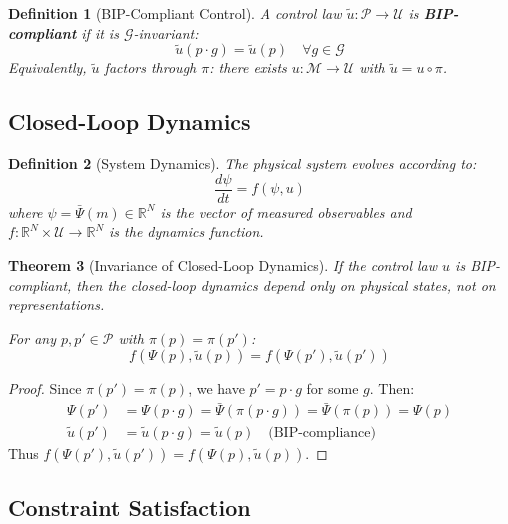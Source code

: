 \documentclass[11pt]{article}
\newtheorem{theorem}{Theorem}[section]
\newtheorem{definition}[theorem]{Definition}
\begin{document}
\begin{definition}[BIP-Compliant Control]
A control law $\tilde{u} : \mathcal{P} \to \mathcal{U}$ is \textbf{BIP-compliant} if it is
$\mathcal{G}$-invariant:
\[
\tilde{u}(p \cdot g) = \tilde{u}(p) \quad \forall g \in \mathcal{G}
\]
Equivalently, $\tilde{u}$ factors through $\pi$: there exists $u : \mathcal{M} \to \mathcal{U}$ with $\tilde{u} = u \circ \pi$.
\end{definition}

\subsection{Closed-Loop Dynamics}

\begin{definition}[System Dynamics]
The physical system evolves according to:
\begin{equation}
\frac{d\psi}{dt} = f(\psi, u)
\label{eq:dynamics}
\end{equation}
where $\psi = \bar{\Psi}(m) \in \mathbb{R}^N$ is the vector of measured observables and $f : \mathbb{R}^N \times \mathcal{U} \to \mathbb{R}^N$ is the
dynamics function.
\end{definition}

\begin{theorem}[Invariance of Closed-Loop Dynamics]
If the control law $u$ is BIP-compliant,
then the closed-loop dynamics depend only on physical states, not on representations.

For any $p, p' \in \mathcal{P}$ with $\pi(p) = \pi(p')$:
\[
f(\Psi(p), \tilde{u}(p)) = f(\Psi(p'), \tilde{u}(p'))
\]
\end{theorem}

\begin{proof}
Since $\pi(p') = \pi(p)$, we have $p' = p \cdot g$ for some $g$. Then:
\begin{align*}
\Psi(p') &= \Psi(p \cdot g) = \bar{\Psi}(\pi(p \cdot g)) = \bar{\Psi}(\pi(p)) = \Psi(p) \\
\tilde{u}(p') &= \tilde{u}(p \cdot g) = \tilde{u}(p) \quad \text{(BIP-compliance)}
\end{align*}
Thus $f(\Psi(p'), \tilde{u}(p')) = f(\Psi(p), \tilde{u}(p))$.
\end{proof}

\subsection{Constraint Satisfaction}
\end{document}
